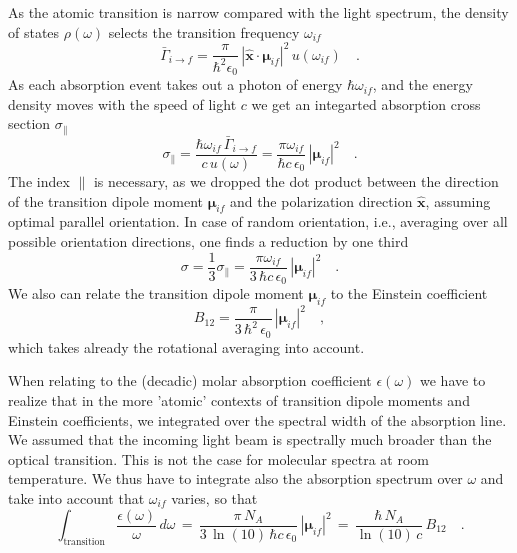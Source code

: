 As the atomic transition is narrow compared with the light spectrum, the density of states $\rho(\omega)$ selects the transition frequency $\omega_{if}$ 
\[
 \bar{\Gamma}_{i \rightarrow f} =   \frac{\pi  }{\hbar^2 \epsilon_0}  \, |\mathbf{\hat{x}} \cdot \mathbf{\mu}_{if} |^2 \,
 u(\omega_{if})   \quad .
\]
As each absorption event takes out a photon of energy $\hbar \omega_{if}$, and the energy density moves with the speed of light $c$ we get an integarted absorption cross section $\sigma_{\parallel} $
\[
 \sigma_{\parallel} = \frac{ \hbar \omega_{if} \, \bar{\Gamma}_{i \rightarrow f} }{c \, u(\omega)}  = 
  \frac{\pi \omega_{if}}{ \hbar c \, \epsilon_0} \,
 |\mathbf{\mu}_{if} |^2  \quad .
\]
The index ${\parallel} $ is necessary, as we dropped the dot product between the direction of the transition dipole moment $\mathbf{\mu}_{if}$ and the polarization direction $\mathbf{\hat{x}}$, assuming optimal parallel orientation. In case of random orientation, i.e., averaging over all possible orientation directions, one finds  a reduction by one third
\[
 \sigma = \frac{1}{3} \sigma_{\parallel} = 
  \frac{\pi \omega_{if}}{ 3 \, \hbar c \, \epsilon_0} \,
 |\mathbf{\mu}_{if} |^2  \quad .
\]
We also can relate the transition dipole moment $\mathbf{\mu}_{if} $ to the Einstein coefficient
\[
B_{12} = \frac{\pi}{3 \, \hbar^2 \, \epsilon_0} \,  |\mathbf{\mu}_{if} |^2  \quad ,
\]
which takes already the rotational averaging into account.


When relating to the  (decadic) molar absorption coefficient $\epsilon(\omega)$ we have to realize that in the more 'atomic' contexts of transition dipole moments and Einstein coefficients, we integrated over the spectral width of the absorption line. We  assumed that the incoming light beam is spectrally much broader than the optical transition. This is not the case for molecular spectra at room temperature. We thus have to integrate also the absorption spectrum over $\omega$ and take into account that $\omega_{if}$ varies, so that
\[
 \int_{\text{transition}} \frac{\epsilon(\omega)}{\omega} \, d \omega \, = \, 
  \frac{\pi \, N_A}{ 3 \, \ln(10) \, \hbar c \, \epsilon_0} \,
 |\mathbf{\mu}_{if} |^2
 \, = \, 
  \frac{\hbar\, N_A}{ \ln(10) \, c } \,
B_{12}  \quad .
\]

\printbibliography[segment=\therefsegment,heading=subbibliography]
